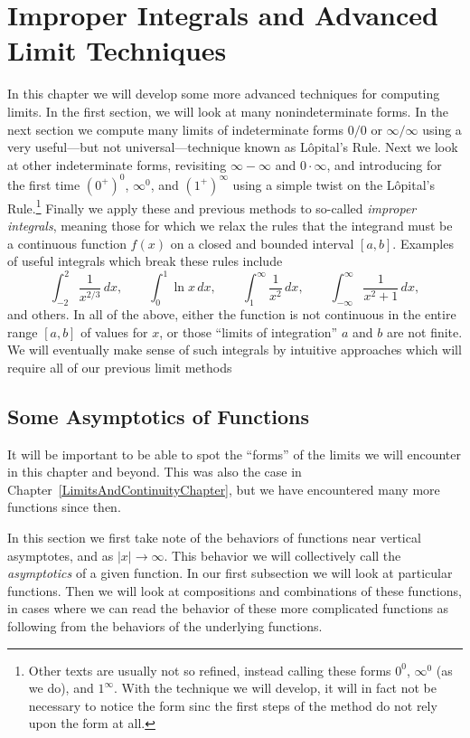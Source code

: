 \chapter{Improper Integrals and Advanced Limit Techniques
\label{ImpropIntsChapter}}
In this chapter we will develop some more advanced techniques for
computing limits.  In the first section, we will look at many
nonindeterminate forms.  In the next section we compute many limits 
of indeterminate forms $0/0$ or $\infty/\infty$ using a very 
useful---but not universal---technique known as L\^opital's Rule.
Next we look at other indeterminate forms, revisiting
$\infty-\infty$ and $0\cdot\infty$, and
introducing for the first time  $(0^+)^0$,
$\infty^0$, and $(1^+)^\infty$ using a simple twist on the  
L\^opital's Rule.\footnote{%
Other texts are usually not so refined, instead calling these forms
$0^0$, $\infty^0$ (as we do), and $1^{\infty}$.  With the technique
we will develop, it will in fact not be necessary to notice the
form sinc the first steps of the method do not rely upon the
form at all.
} Finally we apply these and previous methods
to so-called {\it improper integrals}, meaning those for 
which we relax the rules that the integrand must be a continuous
function $f(x)$ on a closed and bounded interval $[a,b]$. 
Examples of useful integrals which break these rules include
$$\int_{-2}^2\frac1{x^{2/3}}\,dx,\qquad
\int_0^1\ln x\,dx,\qquad
\int_1^\infty\frac1{x^2}\,dx,\qquad
\int_{-\infty}^\infty\frac1{x^2+1}\,dx,
$$
and others.  In all of the above, either the function is not
continuous in the entire range $[a,b]$ of values
for $x$, or those ``limits of integration'' $a$ and $b$ are
not finite.  We will eventually make sense of such integrals by 
intuitive approaches which will require all of our previous limit
methods 

\section{Some Asymptotics of Functions}

It will be important to be able to spot the ``forms'' of the limits 
we will encounter in this chapter and beyond.  This was also the case in
Chapter~\ref{LimitsAndContinuityChapter}, but we have encountered
many more functions since then.  

In this section we first take note of the behaviors of functions
near vertical asymptotes, and as $|x|\to\infty$.  This behavior
we will collectively call the {\it asymptotics} of a given
function.  In our first 
subsection we will look at particular functions.  Then we will
look at compositions and combinations of these functions, in
cases where we can read the behavior of these more complicated
functions as following from the behaviors of the underlying functions.

